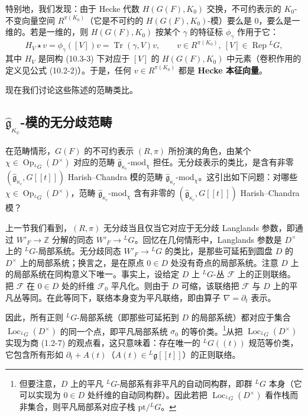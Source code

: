 特别地，我们发现：由于 Hecke 代数 $H(G(F),K_0)$ 交换，不可约表示的 $K_0$-不变向量空间 $R^{\pi(K_0)}$（它是不可约的 $H(G(F),K_0)$-模）要么是 $0$，要么是一维的。若是一维的，则 $H(G(F),K_0)$ 按某个 $\gamma$ 的特征标 $\phi_\gamma$ 作用于它：
\begin{equation}
    H_V\star v=\phi_\gamma([V])v=\operatorname{Tr}(\gamma,V)v,
    \qquad v\in R^{\pi(K_0)},\ [V]\in\operatorname{Rep}{}^LG,
    \tag{10.3-5}
\end{equation}
其中 $H_V$ 是同构 (10.3-3) 下对应于 $[V]$ 的 $H(G(F),K_0)$ 中元素（卷积作用的定义见公式 (10.2-2)）。于是，任何 $v\in R^{\pi(K_0)}$ 都是 \textbf{Hecke 本征向量}。


现在我们讨论这些陈述的范畴类比。

\subsection{$\hat{\mathfrak{g}}_{\kappa_c}$-模的无分歧范畴}

在范畴情形，$G(F)$ 的不可约表示 $(R,\pi)$ 所扮演的角色，由某个 $\chi\in\operatorname{Op}_{{}^LG}(D^\times)$ 对应的范畴 $\hat{\mathfrak{g}}_{\kappa_c}\text{-mod}_\chi$ 担任。无分歧表示的类比，是含有非零 $(\hat{\mathfrak{g}}_{\kappa_c},G[[t]])$ Harish--Chandra 模的范畴 $\hat{\mathfrak{g}}_{\kappa_c}\text{-mod}_\chi$。这引出如下问题：对哪些 $\chi\in\operatorname{Op}_{{}^LG}(D^\times)$，范畴 $\hat{\mathfrak{g}}_{\kappa_c}\text{-mod}_\chi$ 含有非零的 $(\hat{\mathfrak{g}}_{\kappa_c},G[[t]])$ Harish--Chandra 模？

上一节我们看到，$(R,\pi)$ 无分歧当且仅当它对应于无分歧 Langlands 参数，即通过 $W'_F\to\mathbb{Z}$ 分解的同态 $W'_F\to{}^LG$。回忆在几何情形中，Langlands 参数是 $D^\times$ 上的 ${}^LG$-局部系统。无分歧同态 $W'_F\to{}^LG$ 的类比，是那些可延拓到圆盘 $D$ 的 $D^\times$ 上的局部系统；换言之，是在原点 $0\in D$ 处没有奇点的局部系统。注意 $D$ 上的局部系统在同构意义下唯一。事实上，设给定 $D$ 上 ${}^LG$-丛 $\mathcal{F}$ 上的正则联络。把 $\mathcal{F}$ 在 $0\in D$ 处的纤维 $\mathcal{F}_0$ 平凡化。则由于 $D$ 可缩，该联络把 $\mathcal{F}$ 与 $D$ 上的平凡丛等同。在此等同下，联络本身变为平凡联络，即由算子 $\nabla=\partial_t$ 表示。

因此，所有正则 ${}^LG$-局部系统（即那些可延拓到 $D$ 的局部系统）都对应于集合 $\operatorname{Loc}_{{}^LG}(D^\times)$ 的同一个点，即平凡局部系统 $\sigma_0$ 的等价类。\footnote{但要注意，$D$ 上的平凡 ${}^LG$-局部系有非平凡的自动同构群，即群 ${}^LG$ 本身（它可以实现为 $0\in D$ 处纤维的自动同构群）。因此若把 $\operatorname{Loc}_{{}^LG}(D^\times)$ 看作栈而非集合，则平凡局部系对应子栈 $\mathrm{pt}/{}^LG$。}从把 $\operatorname{Loc}_{{}^LG}(D^\times)$ 实现为商 (1.2-7) 的观点看，这只意味着：存在唯一的 ${}^LG((t))$ 规范等价类，它包含所有形如 $\partial_t+A(t)$（$A(t)\in{}^L\mathfrak{g}[[t]]$）的正则联络。

